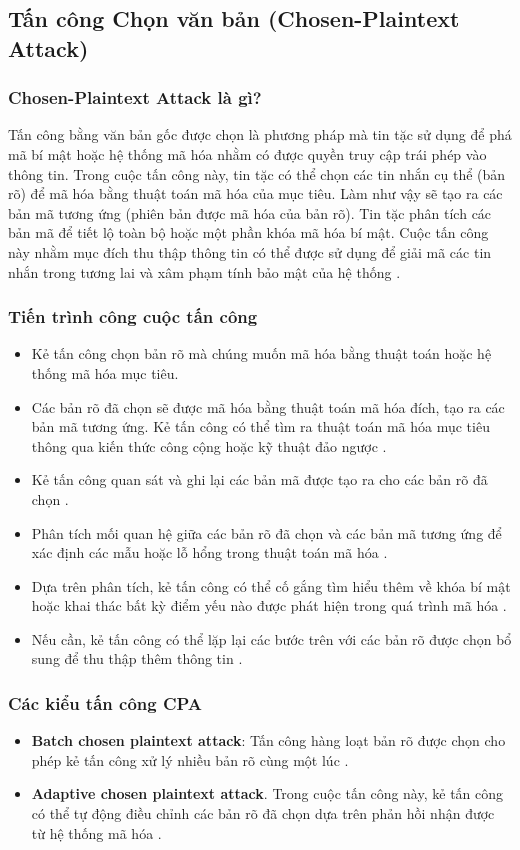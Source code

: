\subsection{Tấn công Chọn văn bản (Chosen-Plaintext Attack)}
\subsubsection{Chosen-Plaintext Attack là gì?}
Tấn công bằng văn bản gốc được chọn là phương pháp mà tin tặc sử dụng để phá mã bí mật hoặc hệ thống mã hóa nhằm có được quyền truy cập trái phép vào thông tin. Trong cuộc tấn công này, tin tặc có thể chọn các tin nhắn cụ thể (bản rõ) để mã hóa bằng thuật toán mã hóa của mục tiêu. Làm như vậy sẽ tạo ra các bản mã tương ứng (phiên bản được mã hóa của bản rõ). Tin tặc phân tích các bản mã để tiết lộ toàn bộ hoặc một phần khóa mã hóa bí mật. Cuộc tấn công này nhằm mục đích thu thập thông tin có thể được sử dụng để giải mã các tin nhắn trong tương lai và xâm phạm tính bảo mật của hệ thống \cite{nordvpn-2024}.
\subsubsection{Tiến trình công cuộc tấn công}
\begin{itemize}
    \item Kẻ tấn công chọn bản rõ mà chúng muốn mã hóa bằng thuật toán hoặc hệ thống mã hóa mục tiêu.\cite{nordvpn-2024}
    \item Các bản rõ đã chọn sẽ được mã hóa bằng thuật toán mã hóa đích, tạo ra các bản mã tương ứng. Kẻ tấn công có thể tìm ra thuật toán mã hóa mục tiêu thông qua kiến thức công cộng hoặc kỹ thuật đảo ngược \cite{nordvpn-2024}.
    \item Kẻ tấn công quan sát và ghi lại các bản mã được tạo ra cho các bản rõ đã chọn \cite{nordvpn-2024}.
    \item Phân tích mối quan hệ giữa các bản rõ đã chọn và các bản mã tương ứng để xác định các mẫu hoặc lỗ hổng trong thuật toán mã hóa \cite{nordvpn-2024}.
    \item Dựa trên phân tích, kẻ tấn công có thể cố gắng tìm hiểu thêm về khóa bí mật hoặc khai thác bất kỳ điểm yếu nào được phát hiện trong quá trình mã hóa \cite{nordvpn-2024}.
    \item Nếu cần, kẻ tấn công có thể lặp lại các bước trên với các bản rõ được chọn bổ sung để thu thập thêm thông tin \cite{nordvpn-2024}.
\end{itemize}
\subsubsection{Các kiểu tấn công CPA}
\begin{itemize}
    \item \textbf{Batch chosen plaintext attack}: Tấn công hàng loạt bản rõ được chọn cho phép kẻ tấn công xử lý nhiều bản rõ cùng một lúc \cite{nordvpn-2024}.
    \item \textbf{Adaptive chosen plaintext attack}. Trong cuộc tấn công này, kẻ tấn công có thể tự động điều chỉnh các bản rõ đã chọn dựa trên phản hồi nhận được từ hệ thống mã hóa \cite{nordvpn-2024}.
\end{itemize}
